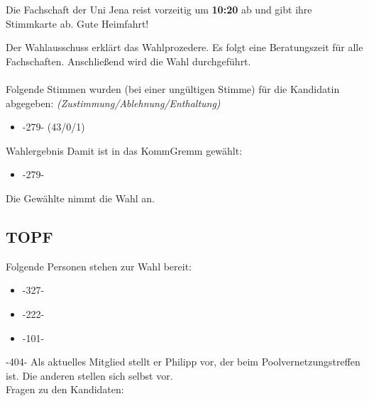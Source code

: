     \begin{info}{}
      Die Fachschaft der Uni Jena reist vorzeitig um \textbf{10:20} ab und gibt ihre Stimmkarte ab. Gute Heimfahrt!
    \end{info}

    Der Wahlausschuss erklärt das Wahlprozedere.
    Es folgt eine Beratungszeit für alle Fachschaften. Anschließend wird die Wahl durchgeführt. \\ \\

    Folgende Stimmen wurden (bei einer ungültigen Stimme) für die Kandidatin abgegeben: \textit{(Zustimmung/Ablehnung/Enthaltung)}
    \begin{itemize}
      \item -279- (43/0/1)
    \end{itemize}

    \begin{success}{Wahlergebnis}
      Damit ist in das KommGremm gewählt:
      \begin{itemize}
        \item -279-
      \end{itemize}
      \tcblower
      Die Gewählte nimmt die Wahl an.
    \end{success}

  \subsection{TOPF}
    Folgende Personen stehen zur Wahl bereit:
    \begin{itemize}
      \item -327-
      \item -222-
      \item -101-
    \end{itemize}
    -404- Als aktuelles Mitglied stellt er Philipp vor, der beim Poolvernetzungstreffen ist. Die anderen stellen sich selbst vor. \\ Fragen zu den Kandidaten:


